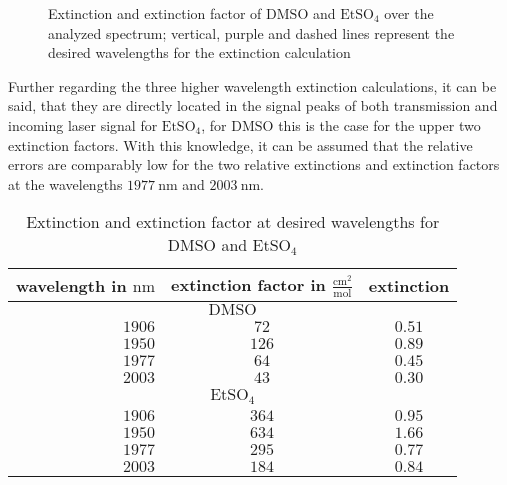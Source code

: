 \begin{figure}[H]
    \centering
    
    \caption[Extinction and extinction factor over the spectrum]{Extinction and extinction factor of $\mathrm{DMSO}$ and $\mathrm{EtSO_4}$ over the analyzed spectrum; vertical, purple and dashed lines represent the desired wavelengths for the extinction calculation }
    \label{fig:extinction}
\end{figure}

Further regarding the three higher wavelength extinction calculations, it can be said, that they are directly located in the signal peaks of both transmission and incoming laser signal for $\mathrm{EtSO_4}$, for $\mathrm{DMSO}$ this is the case for the upper two extinction factors. With this knowledge, it can be assumed that the relative errors are comparably low for the two relative extinctions and extinction factors at the wavelengths $1977~\mathrm{nm}$ and $2003~\mathrm{nm}$.

\begin{table}[!htb]
    \centering
    \small
    \caption[Extinction and extinction factor results]{Extinction and extinction factor at desired wavelengths for $\mathrm{DMSO}$ and $\mathrm{EtSO_4}$}
    \label{tab:extinction}
    \vspace{12pt}
    \begin{tabular}{|r|c|c|}
        \hline
        \rowcolor{lightgray} wavelength in $\mathrm{nm}$ & extinction factor in $\mathrm{\frac{cm^2}{mol}}$ & extinction \\ \hline \hline
        \multicolumn{3}{|c|}{$\mathrm{DMSO}$} \\ \hline \hline
        $1906$ & $72$ & $0.51$ \\ \hline
        $1950$ & $126$ & $0.89$ \\ \hline
        $1977$ & $64$ & $0.45$ \\ \hline
        $2003$ & $43$ & $0.30$ \\ \hline \hline
        \multicolumn{3}{|c|}{$\mathrm{EtSO_4}$} \\ \hline \hline
        $1906$ & $364$ & $0.95$ \\ \hline
        $1950$ & $634$ & $1.66$ \\ \hline
        $1977$ & $295$ & $0.77$ \\ \hline
        $2003$ & $184$ & $0.84$ \\ \hline
    \end{tabular}
\end{table}

